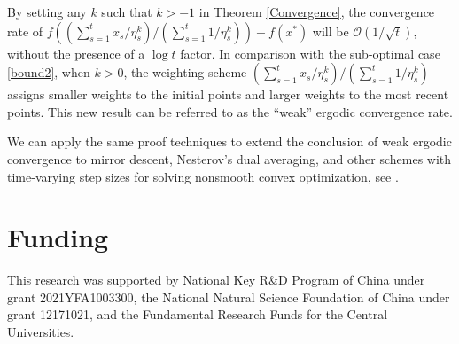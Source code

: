 \begin{remark}
By setting any $k$ such that $k>-1$ in Theorem \ref{Convergence},  the convergence rate of  $f((\sum_{s=1}^t  x_s/\eta_s^k)/(\sum_{s=1}^t 1/ \eta_s^k))-f(x^*)$ will be $\mathcal{O}(1/\sqrt{t})$, without the presence of a $\log t$ factor. In comparison with the sub-optimal case \eqref{bound2}, when $k>0$,  the
 weighting scheme $(\sum_{s=1}^t  x_s/\eta_s^k)/(\sum_{s=1}^t 1/ \eta_s^k)$ assigns smaller weights to the initial points and larger weights to the most recent points. This new result can be referred to as the ``weak'' ergodic convergence rate.
\end{remark}

\begin{remark}\label{r4}
	We can apply the same proof techniques to extend the conclusion of weak ergodic convergence to mirror descent, Nesterov's dual averaging, and other schemes with time-varying step sizes for solving nonsmooth convex optimization, see \cite{nesterov2018lectures,bubeck2015convex}.

\end{remark}


\section*{Funding}
This research was supported by National Key R\&D Program of China under grant 2021YFA1003300, the National Natural Science Foundation of China under grant 12171021, and the Fundamental Research Funds for the Central Universities.


